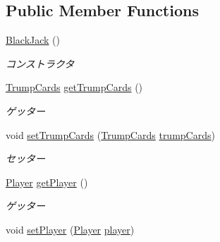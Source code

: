 \subsection*{Public Member Functions}
\begin{DoxyCompactItemize}
\item 
\hyperlink{classjp_1_1gr_1_1java__conf_1_1yuta__yoshinaga_1_1java__trumpcards_1_1_black_jack_a8ec4c341c5db71243c0916980549868d}{Black\+Jack} ()
\begin{DoxyCompactList}\small\item\em コンストラクタ \end{DoxyCompactList}\item 
\hyperlink{classjp_1_1gr_1_1java__conf_1_1yuta__yoshinaga_1_1java__trumpcards_1_1_trump_cards}{Trump\+Cards} \hyperlink{classjp_1_1gr_1_1java__conf_1_1yuta__yoshinaga_1_1java__trumpcards_1_1_black_jack_a19f0d24ac49d16b9db099801cc6f7340}{get\+Trump\+Cards} ()
\begin{DoxyCompactList}\small\item\em ゲッター \end{DoxyCompactList}\item 
void \hyperlink{classjp_1_1gr_1_1java__conf_1_1yuta__yoshinaga_1_1java__trumpcards_1_1_black_jack_a216185ef3f8c02439b201ec52234aecf}{set\+Trump\+Cards} (\hyperlink{classjp_1_1gr_1_1java__conf_1_1yuta__yoshinaga_1_1java__trumpcards_1_1_trump_cards}{Trump\+Cards} \hyperlink{classjp_1_1gr_1_1java__conf_1_1yuta__yoshinaga_1_1java__trumpcards_1_1_black_jack_a7961e6ab54f14237d136f6be831f3014}{trump\+Cards})
\begin{DoxyCompactList}\small\item\em セッター \end{DoxyCompactList}\item 
\hyperlink{classjp_1_1gr_1_1java__conf_1_1yuta__yoshinaga_1_1java__trumpcards_1_1_player}{Player} \hyperlink{classjp_1_1gr_1_1java__conf_1_1yuta__yoshinaga_1_1java__trumpcards_1_1_black_jack_aa4fff12d377006ce93d731a6808b67bd}{get\+Player} ()
\begin{DoxyCompactList}\small\item\em ゲッター \end{DoxyCompactList}\item 
void \hyperlink{classjp_1_1gr_1_1java__conf_1_1yuta__yoshinaga_1_1java__trumpcards_1_1_black_jack_a3c6bfcfb81ccad65be2f5cfb82819951}{set\+Player} (\hyperlink{classjp_1_1gr_1_1java__conf_1_1yuta__yoshinaga_1_1java__trumpcards_1_1_player}{Player} \hyperlink{classjp_1_1gr_1_1java__conf_1_1yuta__yoshinaga_1_1java__trumpcards_1_1_black_jack_a94a3eaa560ab93f938ce2c26dad52eb4}{player})

\end{DoxyCompactItemize}
